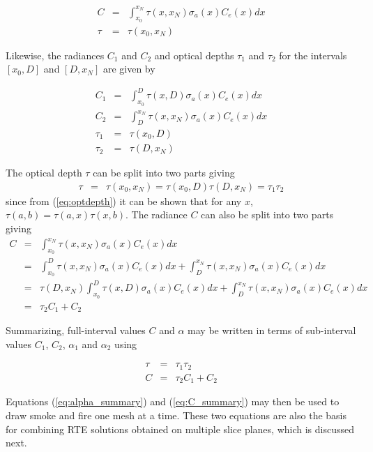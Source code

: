 {\begin{eqnarray*}
C&=&\int_{x_0}^{x_N}\tau(x,x_N)\sigma_a(x)C_e(x)dx\\
\tau&=&\tau(x_0,x_N)
\end{eqnarray*}

Likewise, the radiances $C_1$ and $C_2$ and optical depths $\tau_1$ and $\tau_2$ for the intervals $[x_0,D]$ and $[D,x_N]$ are given by

\begin{eqnarray*}
C_1&=&\int_{x_0}^{D}\tau(x,D)\sigma_a(x)C_e(x)dx\\
C_2&=&\int_{D}^{x_N}\tau(x,x_N)\sigma_a(x)C_e(x)dx\\
\tau_1&=&\tau(x_0,D)\\
\tau_2&=&\tau(D,x_N)
\end{eqnarray*}

The optical depth $\tau$ can be split into two parts giving
\begin{eqnarray*}
\tau&=&\tau(x_0,x_N)=\tau(x_0,D)\tau(D,x_N)=\tau_1\tau_2
\end{eqnarray*}
since from (\ref{eq:optdepth}) it can be shown that for any $x$, $\tau(a,b)=\tau(a,x)\tau(x,b)$.
The radiance $C$ can also be split into two parts giving
\begin{eqnarray*}
C&=&\int_{x_0}^{x_N}\tau(x,x_N)\sigma_a(x)C_e(x)dx\\
&=&\int_{x_0}^{D}\tau(x,x_N)\sigma_a(x)C_e(x)dx+\int_{D}^{x_N}\tau(x,x_N)\sigma_a(x)C_e(x)dx\\
&=&\tau(D,x_N)\int_{x_0}^{D}\tau(x,D)\sigma_a(x)C_e(x)dx+\int_{D}^{x_N}\tau(x,x_N)\sigma_a(x)C_e(x)dx\\
&=&\tau_2C_1+C_2
\end{eqnarray*}

Summarizing, full-interval values $C$ and $\alpha$ may be written in terms of sub-interval values $C_1$, $C_2$, $\alpha_1$ and $\alpha_2$ using

\begin{eqnarray}
\label{eq:alpha_summary}
\tau&=&\tau_1\tau_2\\
\label{eq:C_summary}
C&=&\tau_2C_1+C_2
\end{eqnarray}

Equations (\ref{eq:alpha_summary}) and (\ref{eq:C_summary}) may then be used to draw smoke and fire one mesh at a time.  These two equations are also the basis for combining RTE solutions obtained on multiple slice planes, which is discussed next.


}
